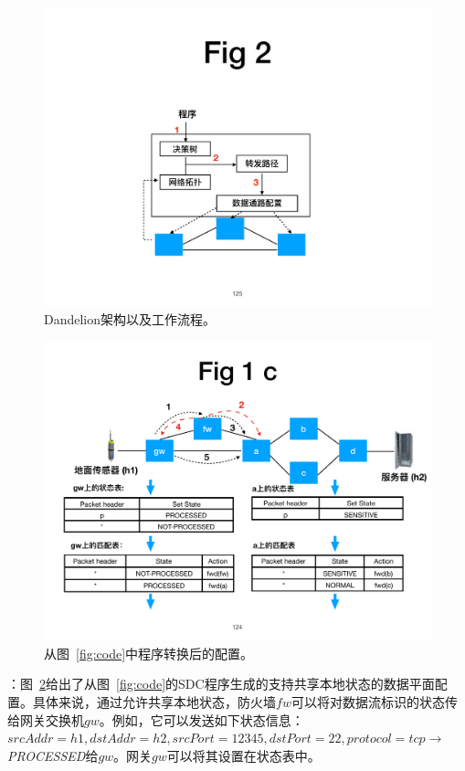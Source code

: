 \begin{figure}[!htbp]
\centering

      \centering\includegraphics[width=0.5\linewidth]{figures/ss-125.pdf}
\caption{Dandelion架构以及工作流程。}
\label{fig:system-workflow}
\end{figure}

\begin{figure}[!htbp]
\centering
      \centering\includegraphics[width=0.95\linewidth]{figures/ss-124.pdf}
    \caption{从图~\ref{fig:code}中程序转换后的配置。}
\label{fig:dsdc-result}
\end{figure}

：图~\ref{fig:dsdc-result}给出了从图~\ref{fig:code}的SDC程序生成的支持共享本地状态的数据平面配置。具体来说，通过允许共享本地状态，防火墙$fw$可以将对数据流标识的状态传给网关交换机$gw$。例如，它可以发送如下状态信息：$srcAddr=h1,dstAddr=h2,srcPort=12345,dstPort=22,protocol=tcp \rightarrow$
\emph{PROCESSED}给$gw$。网关$gw$可以将其设置在状态表中。

